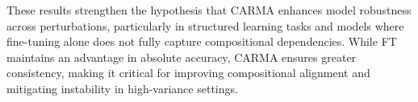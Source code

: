 These results strengthen the hypothesis that CARMA enhances model robustness across perturbations, particularly in structured learning tasks and models where fine-tuning alone does not fully capture compositional dependencies. While FT maintains an advantage in absolute accuracy, CARMA ensures greater consistency, making it critical for improving compositional alignment and mitigating instability in high-variance settings.





